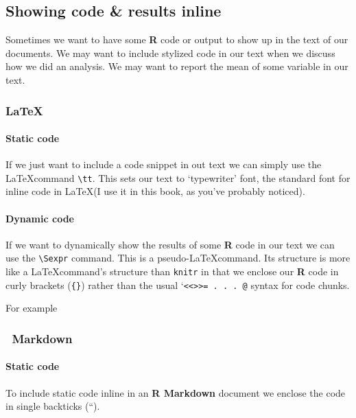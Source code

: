 \documentclass[ChapterTOCs,krantz1]{krantz}\usepackage{graphicx, color}
\begin{document}
\subsection{Showing code \& results inline}

Sometimes we want to have some \textbf{R} code or output to show up in
the text of our documents. We may want to include stylized code in our
text when we discuss how we did an analysis. We may want to report the
mean of some variable in our text.

\subsubsection{\LaTeX  }

\paragraph{Static code}

If we just want to include a code snippet in out text we can simply use
the \LaTeX command \texttt{\textbackslash{}tt}. This sets our text to
`typewriter' font, the standard font for inline code in \LaTeX (I use it
in this book, as you've probably noticed).

\paragraph{Dynamic code}

If we want to dynamically show the results of some \textbf{R} code in
our text we can use the \texttt{\textbackslash{}Sexpr} command. This is
a pseudo-\LaTeX command. Its structure is more like a \LaTeX command's
structure than \texttt{knitr} in that we enclose our \textbf{R} code in
curly brackets (\texttt{\{\}}) rather than the usual
`\texttt{\textless{}\textless{}\textgreater{}\textgreater{}= . . . @}
syntax for code chunks.

For example

\subsubsection{~Markdown}

\paragraph{Static code}

To include static code inline in an \textbf{R Markdown} document we
enclose the code in single backticks (``).
\end{document}
